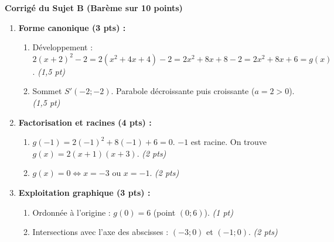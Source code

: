 \documentclass[11pt,a4paper]{article}
\newcommand{\partie}[1]{%
  \vspace{0.9em}%
  \noindent\textbf{#1}%
  \par\vspace{0.3em}%
}
\begin{document}
\vspace{1.5em}
\partie{Corrigé du Sujet B (Barème sur 10 points)}
\begin{enumerate}
  \item \textbf{Forme canonique (3 pts) :}
  \begin{enumerate}
    \item Développement : $2(x + 2)^2 - 2 = 2(x^2 + 4x + 4) - 2 = 2x^2 + 8x + 8 - 2 = 2x^2 + 8x + 6 = g(x)$. \emph{(1,5 pt)}
    \item Sommet $S'(-2 ; -2)$. Parabole décroissante puis croissante ($a = 2 > 0$). \emph{(1,5 pt)}
  \end{enumerate}
  \item \textbf{Factorisation et racines (4 pts) :}
  \begin{enumerate}
    \item $g(-1) = 2(-1)^2 + 8(-1) + 6 = 0$. $-1$ est racine. On trouve $g(x) = 2(x + 1)(x + 3)$. \emph{(2 pts)}
    \item $g(x) = 0 \iff x = -3$ ou $x = -1$. \emph{(2 pts)}
  \end{enumerate}
  \item \textbf{Exploitation graphique (3 pts) :}
  \begin{enumerate}
    \item Ordonnée à l'origine : $g(0) = 6$ (point $(0 ; 6)$). \emph{(1 pt)}
    \item Intersections avec l'axe des abscisses : $(-3 ; 0)$ et $(-1 ; 0)$. \emph{(2 pts)}
  \end{enumerate}
\end{enumerate}
\end{document}
